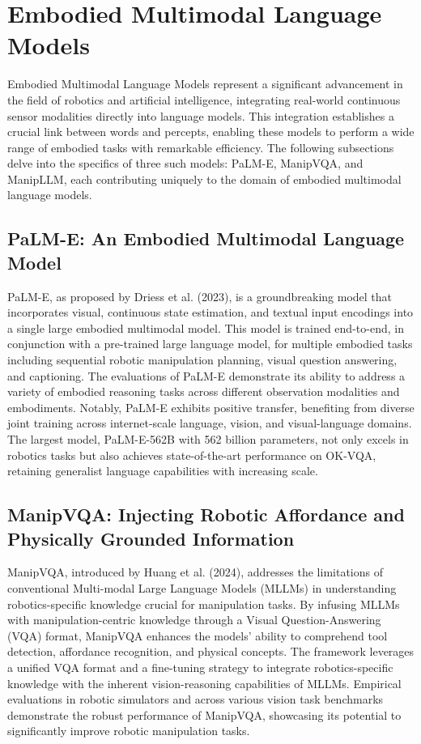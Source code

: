 \documentclass[a4paper]{article}
\begin{document}
\section{Embodied Multimodal Language Models}
Embodied Multimodal Language Models represent a significant advancement in the field of robotics and artificial intelligence, integrating real-world continuous sensor modalities directly into language models. This integration establishes a crucial link between words and percepts, enabling these models to perform a wide range of embodied tasks with remarkable efficiency. The following subsections delve into the specifics of three such models: PaLM-E, ManipVQA, and ManipLLM, each contributing uniquely to the domain of embodied multimodal language models.

\subsection{PaLM-E: An Embodied Multimodal Language Model}
PaLM-E, as proposed by Driess et al. (2023), is a groundbreaking model that incorporates visual, continuous state estimation, and textual input encodings into a single large embodied multimodal model. This model is trained end-to-end, in conjunction with a pre-trained large language model, for multiple embodied tasks including sequential robotic manipulation planning, visual question answering, and captioning. The evaluations of PaLM-E demonstrate its ability to address a variety of embodied reasoning tasks across different observation modalities and embodiments. Notably, PaLM-E exhibits positive transfer, benefiting from diverse joint training across internet-scale language, vision, and visual-language domains. The largest model, PaLM-E-562B with 562 billion parameters, not only excels in robotics tasks but also achieves state-of-the-art performance on OK-VQA, retaining generalist language capabilities with increasing scale.

\subsection{ManipVQA: Injecting Robotic Affordance and Physically Grounded Information}
ManipVQA, introduced by Huang et al. (2024), addresses the limitations of conventional Multi-modal Large Language Models (MLLMs) in understanding robotics-specific knowledge crucial for manipulation tasks. By infusing MLLMs with manipulation-centric knowledge through a Visual Question-Answering (VQA) format, ManipVQA enhances the models' ability to comprehend tool detection, affordance recognition, and physical concepts. The framework leverages a unified VQA format and a fine-tuning strategy to integrate robotics-specific knowledge with the inherent vision-reasoning capabilities of MLLMs. Empirical evaluations in robotic simulators and across various vision task benchmarks demonstrate the robust performance of ManipVQA, showcasing its potential to significantly improve robotic manipulation tasks.
\end{document}
